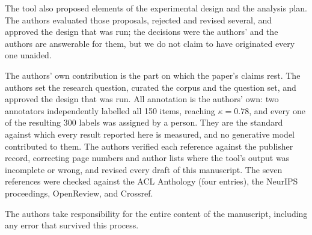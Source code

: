 \documentclass[11pt,a4paper]{article}
\begin{document}
The tool also proposed elements of the experimental design and the analysis
plan. The authors evaluated those proposals, rejected and revised several, and
approved the design that was run; the decisions were the authors' and the
authors are answerable for them, but we do not claim to have originated every
one unaided.

The authors' own contribution is the part on which the paper's claims rest. The
authors set the research question, curated the corpus and the question set, and
approved the design that was run. All annotation is the authors' own: two
annotators independently labelled all 150 items, reaching $\kappa = 0.78$, and
every one of the resulting 300 labels was assigned by a person. They are the standard
against which every result reported here is measured, and no generative model
contributed to them. The authors verified each reference against the publisher
record, correcting page numbers and author lists where the tool's output was
incomplete or wrong, and revised every draft of this manuscript. The seven
references were checked against the ACL Anthology (four entries), the NeurIPS
proceedings, OpenReview, and Crossref.

The authors take responsibility for the entire content of the manuscript,
including any error that survived this process.



\end{document}

